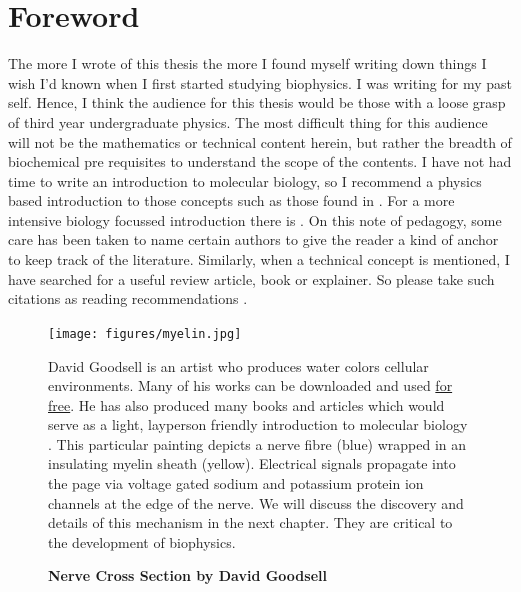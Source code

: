 \chapter*{Foreword}
\label{chap:foreword}
 {}

The more I wrote of this thesis the more I found myself writing down things I wish I'd known when I first started studying biophysics. I was writing for my past self. Hence, I think the audience for this thesis would be those with a loose grasp of third year undergraduate physics. The most difficult thing for this audience will not be the mathematics or technical content herein, but rather the breadth of biochemical pre requisites to understand the scope of the contents. I have not had time to write an introduction to molecular biology, so I recommend a physics based introduction to those concepts such as those found in \cite{phillips2012}. For a more intensive biology focussed introduction there is \cite{pollard2016}. On this note of pedagogy, some care has been taken to name certain authors to give the reader a kind of anchor to keep track of the literature. Similarly, when a technical concept is mentioned, I have searched for a useful review article, book or explainer. So please take such citations as reading recommendations \cite{dawkins1989, hofstadter1999}.

\begin{figure}[h]
	\begin{center}
		\texttt{[image: figures/myelin.jpg]}
	\end{center}
	\captionsetup{singlelinecheck = false, justification=raggedright}
	\caption[Nerve Cross Section by David Goodsell] {\textbf{Nerve Cross Section by David Goodsell}}{David Goodsell is an artist who produces water colors cellular environments. Many of his works can be downloaded and used \href{https://pdb101.rcsb.org/sci-art/goodsell-gallery}{for free}. He has also produced many books and articles which would serve as a light, layperson friendly introduction to molecular biology \cite{goodsell2009, goodsell2018, goodsell2020}. This particular painting depicts a nerve fibre (blue) wrapped in an insulating myelin sheath (yellow). Electrical signals propagate into the page via voltage gated sodium and potassium protein ion channels at the edge of the nerve\cite{goodsell_nerve}. We will discuss the discovery and details of this mechanism in the next chapter. They are critical to the development of biophysics.}
	\label{goodsell_figure}
\end{figure}

